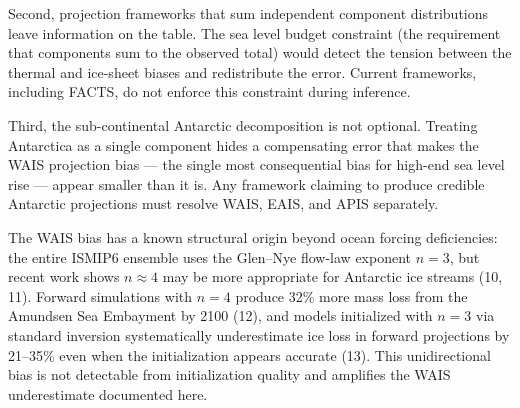 \documentclass[11pt]{article}
\begin{document}
Second, projection frameworks that sum independent component distributions leave information on the table.  The sea level budget constraint (the requirement that components sum to the observed total) would detect the tension between the thermal and ice-sheet biases and redistribute the error.  Current frameworks, including FACTS, do not enforce this constraint during inference.

Third, the sub-continental Antarctic decomposition is not optional.  Treating Antarctica as a single component hides a compensating error that makes the WAIS projection bias --- the single most consequential bias for high-end sea level rise --- appear smaller than it is.  Any framework claiming to produce credible Antarctic projections must resolve WAIS, EAIS, and APIS separately.

The WAIS bias has a known structural origin beyond ocean forcing deficiencies: the entire ISMIP6 ensemble uses the Glen--Nye flow-law exponent $n = 3$, but recent work shows $n \approx 4$ may be more appropriate for Antarctic ice streams (10, 11).  Forward simulations with $n = 4$ produce 32\% more mass loss from the Amundsen Sea Embayment by 2100 (12), and models initialized with $n = 3$ via standard inversion systematically underestimate ice loss in forward projections by 21--35\% even when the initialization appears accurate (13).  This unidirectional bias is not detectable from initialization quality and amplifies the WAIS underestimate documented here.


\end{document}
